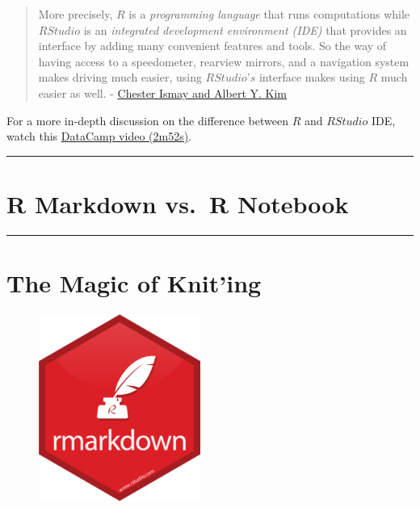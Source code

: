 \documentclass[]{book}
\begin{document}
\begin{quote}
More precisely, \(R\) is a \emph{programming language} that runs
computations while \(R Studio\) is an \emph{integrated development
environment (IDE)} that provides an interface by adding many convenient
features and tools. So the way of having access to a speedometer,
rearview mirrors, and a navigation system makes driving much easier,
using \(RStudio’s\) interface makes using \(R\) much easier as well. -
\href{https://ismayc.github.io/moderndive/index.html}{Chester Ismay and
Albert Y. Kim}
\end{quote}

For a more in-depth discussion on the difference between \(R\) and
\(R Studio\) IDE, watch this
\href{https://campus.datacamp.com/courses/working-with-the-rstudio-ide-part-1/orientation?ex=1}{DataCamp
video (2m52s)}.

\begin{center}\rule{0.5\linewidth}{\linethickness}\end{center}

\section{R Markdown vs.~R Notebook}\label{r-markdown-vs.r-notebook}

\begin{center}\rule{0.5\linewidth}{\linethickness}\end{center}

\section{The Magic of Knit'ing}\label{the-magic-of-kniting}

\begin{figure}
\centering
\includegraphics{images/hex/rmarkdown-200x232.png}
\caption{}
\end{figure}
\end{document}
